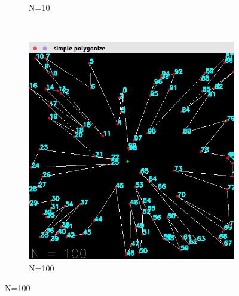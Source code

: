 \documentclass[a4paper, 12pt]{report}
\begin{document}
\begin{figure}[h]
\begin{subfigure}[t]{0.4\textwidth}
    	\caption{N=10}
    \end{subfigure}%
    ~
    \begin{subfigure}[t]{0.4\textwidth}
    	\centering
    	\includegraphics[width=\textwidth]{3-n100}
    	\caption{N=100}
    \end{subfigure}
\end{figure}
\end{document}
